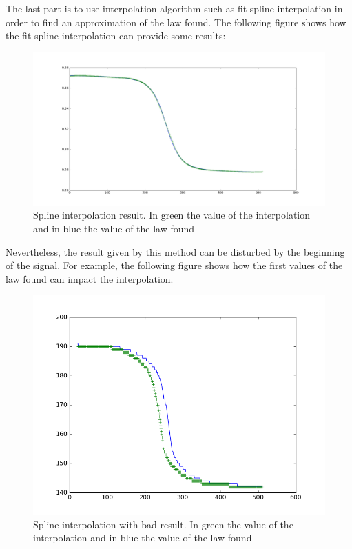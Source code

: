 The last part is to use interpolation algorithm such as fit spline interpolation in order to find an approximation of the law found. The following figure shows how the fit spline interpolation can provide some results:

\begin{figure}[H]
\centering
    \includegraphics[scale=0.35,angle=0]{Images/spline_pour_la_loi_de_frequence_trouvee.png}
    \caption{Spline interpolation result. In green the value of the interpolation and in blue the value of the law found}
    \label{fig:spline_pour_la_loi_de_frequence_trouvee}
\end{figure}

Nevertheless, the result given by this method can be disturbed by the beginning of the signal. For example, the following figure shows how the first values of the law found can impact the interpolation.

\begin{figure}[H]
\centering
    \includegraphics[scale=0.7,angle=0]{Images/spline_pour_la_loi_de_frequence_trouvee2.png}
    \caption{Spline interpolation with bad result. In green the value of the interpolation and in blue the value of the law found}
    \label{fig:spline_pour_la_loi_de_frequence_trouvee2}
\end{figure}

